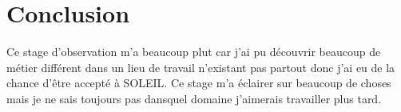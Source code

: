 





			
	\section{Conclusion}
		Ce stage d'observation m'a beaucoup plut car j'ai pu découvrir beaucoup de métier différent dans un lieu de travail n'existant pas partout donc j'ai eu de la chance d'être accepté à SOLEIL. Ce stage m'a éclairer sur beaucoup de choses mais je ne sais toujours pas dansquel domaine j'aimerais travailler plus tard. 

